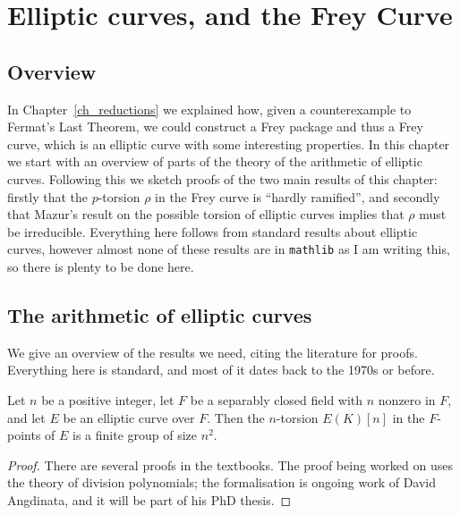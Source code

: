 \chapter{Elliptic curves, and the Frey Curve}\label{ch_frey}

\section{Overview}

In Chapter~\ref{ch_reductions} we explained how, given a counterexample to Fermat's Last Theorem, we could construct a Frey package and thus a Frey curve, which is an elliptic curve with some interesting properties. In this chapter we start with an overview of parts of the theory of the arithmetic of elliptic curves. Following
this we sketch proofs of the two main results of this chapter: firstly that the $p$-torsion $\rho$ in the Frey curve is ``hardly ramified'', and secondly that Mazur's result on the possible torsion of elliptic curves implies that $\rho$ must be irreducible. Everything here follows from standard results about elliptic curves, however almost none of these results are in {\tt mathlib} as I am writing this, so there is plenty to be done here.

\section{The arithmetic of elliptic curves}

We give an overview of the results we need, citing the literature for proofs. Everything here is
 standard, and most of it dates back to the 1970s or before.

\begin{theorem}\label{WeierstrassCurve.n_torsion_card}\notready
  Let $n$ be a positive integer, let $F$ be a separably closed
  field with $n$ nonzero in $F$, and let $E$ be an elliptic curve over $F$. Then the $n$-torsion $E(K)[n]$
  in the $F$-points of $E$ is a finite group of size $n^2$.
\end{theorem}
\begin{proof}
  There are several proofs in the textbooks. The proof being worked on uses the theory of division polynomials; the formalisation is ongoing work of David Angdinata, and it will be part of his PhD thesis.
\end{proof}

